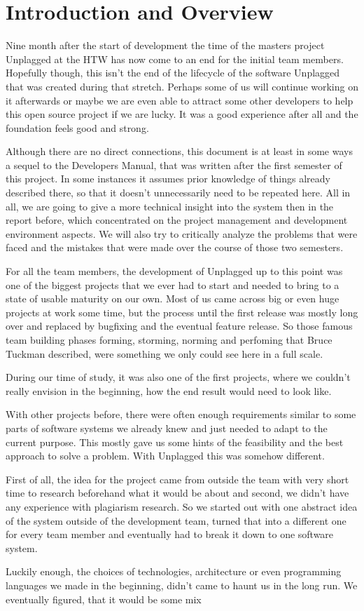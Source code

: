 \chapter*{Introduction and Overview}

Nine month after the start of development the time of the masters project Unplagged at the HTW has now come to an end for the 
initial team members. Hopefully though, 
this isn't the end of the lifecycle of the software Unplagged that was created during that stretch. Perhaps some of us will continue working on it afterwards or maybe we are even able to attract some other developers to help this open source project if we are lucky. It was a good experience after all and the foundation feels good and strong.

Although there are no direct connections, this document is at least in some ways a sequel to the Developers Manual, that was
written after the first semester of this project. In some instances it assumes prior knowledge of things already described there, so that it doesn't unnecessarily need to be repeated here.
All in all, we are going to give a more technical insight into the system then in the report before, which concentrated
on the project management and development environment aspects. We will also try to critically 
analyze the problems that were faced and the mistakes that were made over the course of those
two semesters.

For all the team members, the development of Unplagged up to this point was one of 
the biggest 
projects that we ever had to start and needed to bring to a state of usable 
maturity on our own. Most of us came across big or even huge projects at work some time, but the process until 
the first release was mostly long over and replaced by bugfixing and the eventual feature release.
So those famous team building phases forming, storming, norming and perfoming that Bruce Tuckman described\citep{tuckman1984},
were something we only could see here in a full scale.

During our time of study, it was also one of the first projects, 
where we couldn't really envision in the beginning, how the end result would need to look like.

With other projects before, there were often enough requirements similar to some
parts of software systems we already knew and just needed to adapt to the current purpose.
This mostly gave us some hints of the feasibility and the best approach to solve a problem.
With Unplagged this was somehow different.

First of all, the idea for the project came from outside the team with very short time to research beforehand what it would be 
about and second, we didn't have any experience with plagiarism research. So we started out with one abstract idea of the system 
outside of the development team, turned that into a different one for every team member and eventually had to break it down to one software system.

Luckily enough, the choices of technologies, architecture or even programming languages we made in the beginning, didn't came to haunt us in
the long run.
We eventually figured, that it would be some mix
